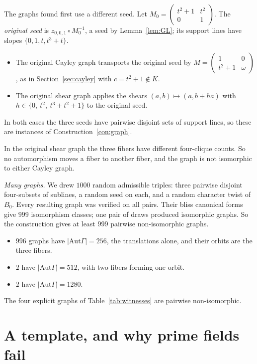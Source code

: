 \documentclass[11pt]{amsart}
\theoremstyle{definition}
\newcommand{\Aut}{\mathrm{Aut}}
\begin{document}
The graphs found first use a different seed. Let $M_0=\begin{pmatrix}t^2+1&t^2\\0&1\end{pmatrix}$. The \emph{original seed} is $z_{0,0,1}\circ M_0^{-1}$, a seed by Lemma~\ref{lem:GL}; its support lines have slopes $\{0,1,t,t^3+t\}$.
\begin{itemize}
\item The original Cayley graph transports the original seed by $M=\begin{pmatrix}1&0\\ t^2+1&\omega\end{pmatrix}$, as in Section~\ref{sec:cayley} with $c=t^2+1\notin K$.
\item The original shear graph applies the shears $(a,b)\mapsto(a,b+ha)$ with $h\in\{0,\ t^2,\ t^3+t^2+1\}$ to the original seed.
\end{itemize}
In both cases the three seeds have pairwise disjoint sets of support lines, so these are instances of Construction~\ref{con:graph}.

In the original shear graph the three fibers have different four-clique counts. So no automorphism moves a fiber to another fiber, and the graph is not isomorphic to either Cayley graph.

\emph{Many graphs.} We drew $1000$ random admissible triples: three pairwise disjoint four-subsets of sublines, a random seed on each, and a random character twist of $B_0$. Every resulting graph was verified on all pairs. Their bliss canonical forms give $999$ isomorphism classes; one pair of draws produced isomorphic graphs. So the construction gives at least $999$ pairwise non-isomorphic graphs.
\begin{itemize}
\item $996$ graphs have $|\Aut\Gamma|=256$, the translations alone, and their orbits are the three fibers.
\item $2$ have $|\Aut\Gamma|=512$, with two fibers forming one orbit.
\item $2$ have $|\Aut\Gamma|=1280$.
\end{itemize}
The four explicit graphs of Table~\ref{tab:witnesses} are pairwise non-isomorphic.

\section{A template, and why prime fields fail}\label{sec:template}
\end{document}
